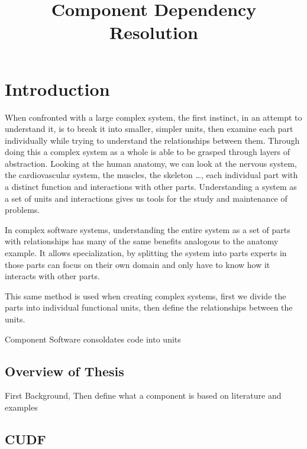 \documentclass{report}
\title{Component Dependency Resolution}
\begin{document}
\chapter{Introduction}

{}When confronted with a large complex system, the first instinct, in an attempt to understand it, is to break it into smaller, simpler units, 
{}then examine each part individually while trying to understand the relationships between them.
{}Through doing this a complex system as a whole is able to be grasped through layers of abstraction.
{}Looking at the human anatomy, we can look at the nervous system, the cardiovascular system, the muscles, the skeleton \ldots,
{}each individual part with a distinct function and interactions with other parts.
{}Understanding a system as a set of units and interactions gives us tools for the study and maintenance of problems.  

{}In complex software systems, understanding the entire system as a set of parts with relationships has many of the same benefits analogous to the anatomy example.
{}It allows specialization, 
{}by splitting the system into parts experts in those parts can focus on their own domain and only have to know how it interacts with other parts.

{}This same method is used when creating complex systems, first we divide the parts into individual functional units,
{}then define the relationships between the units.


Component Software consoldates code into units


\section{Overview of Thesis}
First Background,
Then define what a component is based on literature and examples














\section{CUDF}
\end{document}
